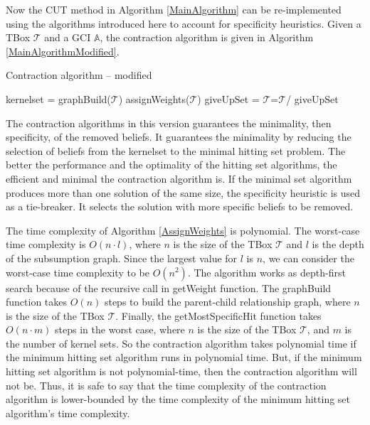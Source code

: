 Now the CUT method in Algorithm \ref{MainAlgorithm} can be re-implemented using the algorithms introduced here to account for specificity heuristics. Given a TBox $\mathcal{T}$ and a GCI $\mathbb{A}$, the contraction algorithm is given in Algorithm \ref{MainAlgorithmModified}.

\begin{algorithm}
\caption{Contraction algorithm -- modified}
\label{MainAlgorithmModified}
\begin{algorithmic}[1]
\State kernelset = 
\State graphBuild($\mathcal{T}$)
\State assignWeights($\mathcal{T}$)
\State giveUpSet = 
\State$\mathcal{T}$=$\mathcal{T}$/ giveUpSet
\EndProcedure
\end{algorithmic}
\end{algorithm}

The contraction algorithms in this version guarantees the minimality, then specificity, of the removed beliefs. It guarantees the minimality by reducing the selection of beliefs from the kernelset to the minimal hitting set problem. The better the performance and the optimality of the hitting set algorithms, the efficient and minimal the contraction algorithm is. If the minimal set algorithm produces more than one solution of the same size, the specificity heuristic is used as a tie-breaker. It selects the solution with more specific beliefs to be removed.

The time complexity of Algorithm \ref{AssignWeights} is polynomial. The worst-case time complexity is $O(n \cdot l)$, where $n$ is the size of the TBox $\mathcal{T}$ and $l$ is the depth of the subsumption graph. Since the largest value for $l$ is $n$, we can consider the worst-case time complexity to be $O(n^2)$. The algorithm works as depth-first search because of the recursive call in getWeight function. The graphBuild function takes $O(n)$ steps to build the parent-child relationship graph, where $n$ is the size of the TBox $\mathcal{T}$. Finally, the getMostSpecificHit function takes $O(n \cdot m)$ steps in the worst case, where $n$ is the size of the TBox $\mathcal{T}$, and $m$ is the number of kernel sets. So the contraction algorithm takes polynomial time if the minimum hitting set algorithm runs in polynomial time. But, if the minimum hitting set algorithm is not polynomial-time, then the contraction algorithm will not be. Thus, it is safe to say that the time complexity of the contraction algorithm is lower-bounded by the time complexity of the minimum hitting set algorithm's time complexity.